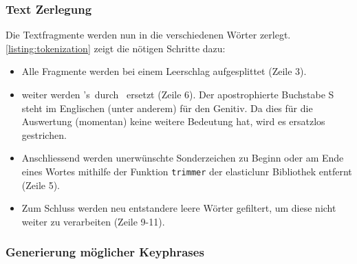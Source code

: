
\subsubsection{Text Zerlegung}


Die Textfragmente werden nun in die verschiedenen Wörter zerlegt. \autoref{listing:tokenization} zeigt die nötigen Schritte dazu:
\begin{itemize}
    \item Alle Fragmente werden bei einem Leerschlag aufgesplittet (Zeile 3).
    \item weiter werden \glqq's\grqq\, durch \glqq \: \grqq\, ersetzt (Zeile 6). Der apostrophierte Buchstabe S steht im Englischen (unter anderem) für den Genitiv. Da dies für die Auswertung (momentan) keine weitere Bedeutung hat, wird es ersatzlos gestrichen.
    \item Anschliessend werden unerwünschte Sonderzeichen zu Beginn oder am Ende eines Wortes mithilfe der Funktion \texttt{trimmer} der \gls{elasticlunr} Bibliothek entfernt (Zeile 5).
    \item Zum Schluss werden neu entstandere leere Wörter gefiltert, um diese nicht weiter zu verarbeiten (Zeile 9-11). 
\end{itemize}



\subsubsection{Generierung möglicher Keyphrases}


